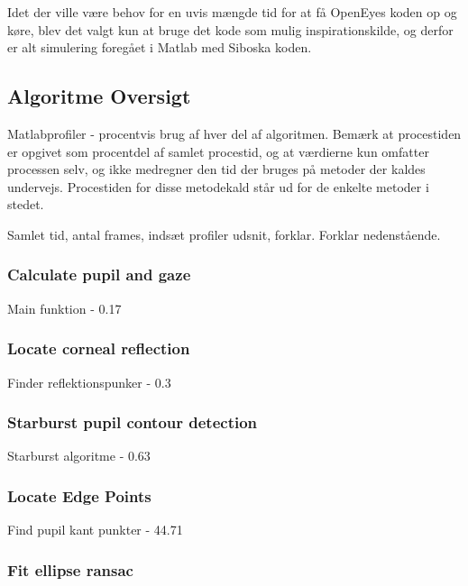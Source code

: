 \documentclass[a4paper,oneside,12pt]{article}
\begin{document}
	Idet der ville være behov for en uvis mængde tid for at få OpenEyes koden op og køre, blev det valgt kun at bruge det kode som mulig inspirationskilde, og derfor er alt simulering foregået i Matlab med Siboska koden.
	
	\subsection{Algoritme Oversigt}
	
	Matlabprofiler - procentvis brug af hver del af algoritmen.
	Bemærk at procestiden er opgivet som procentdel af samlet procestid, og at værdierne kun omfatter processen selv, og ikke medregner den tid der bruges på metoder der kaldes undervejs. Procestiden for disse metodekald står ud for de enkelte metoder i stedet.
	
	
	Samlet tid, antal frames, indsæt profiler udsnit, forklar.
	Forklar nedenstående.
	
	\subsubsection{Calculate pupil and gaze}
	
	Main funktion - 0.17%
	
	\subsubsection{Locate corneal reflection}
	
	Finder reflektionspunker - 0.3%
	
	\subsubsection{Starburst pupil contour detection}
	
	Starburst algoritme - 0.63%
	
	\subsubsection{Locate Edge Points}
	
	Find pupil kant punkter - 44.71%
	
	\subsubsection{Fit ellipse ransac}
	
\end{document}
